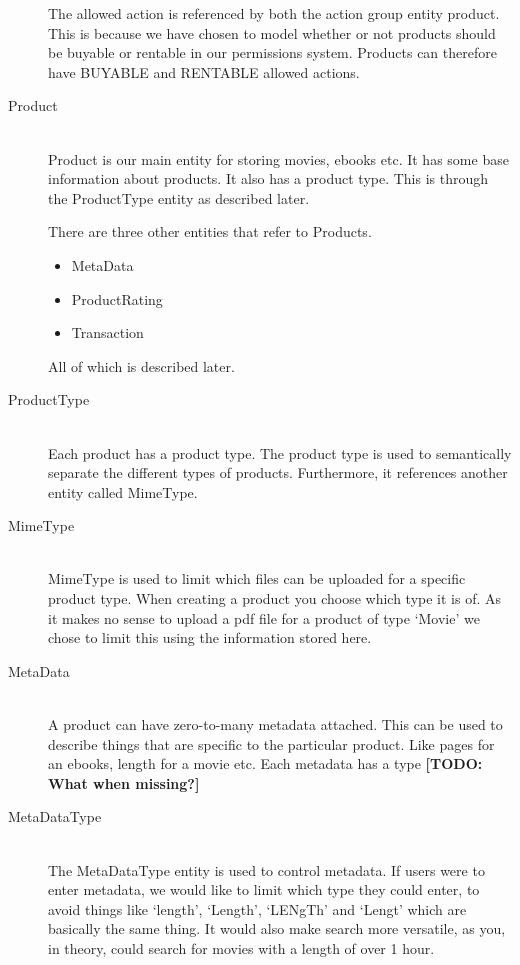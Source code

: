 \begin{description}
The allowed action is referenced by both the action group entity product. This is because we have chosen to model whether or not products should be buyable or rentable in our permissions system. Products can therefore have BUYABLE and RENTABLE allowed actions.

\item[Product] \hfill \\ 
Product is our main entity for storing movies, ebooks etc. It has some base information about products. It also has a product type. This is through the ProductType entity as described later.

There are three other entities that refer to Products.
\begin{itemize}
	\item MetaData
	\item ProductRating
	\item Transaction
\end{itemize}
All of which is described later.

\item[ProductType] \hfill \\
Each product has a product type. The product type is used to semantically separate the different types of products. Furthermore, it references another entity called MimeType.

\item[MimeType] \hfill \\
MimeType is used to limit which files can be uploaded for a specific product type. When creating a product you choose which type it is of. As it makes no sense to upload a pdf file for a product of type `Movie' we chose to limit this using the information stored here.

\item[MetaData] \hfill \\
A product can have zero-to-many metadata attached. This can be used to describe things that are specific to the particular product. Like pages for an ebooks, length for a movie etc. Each metadata has a type \textbf{[TODO: What when missing?]}

\item[MetaDataType] \hfill \\
The MetaDataType entity is used to control metadata. If users were to enter metadata, we would like to limit which type they could enter, to avoid things like `length', `Length', `LENgTh' and `Lengt' which are basically the same thing. It would also make search more versatile, as you, in theory, could search for movies with a length of over 1 hour.


\end{description}
